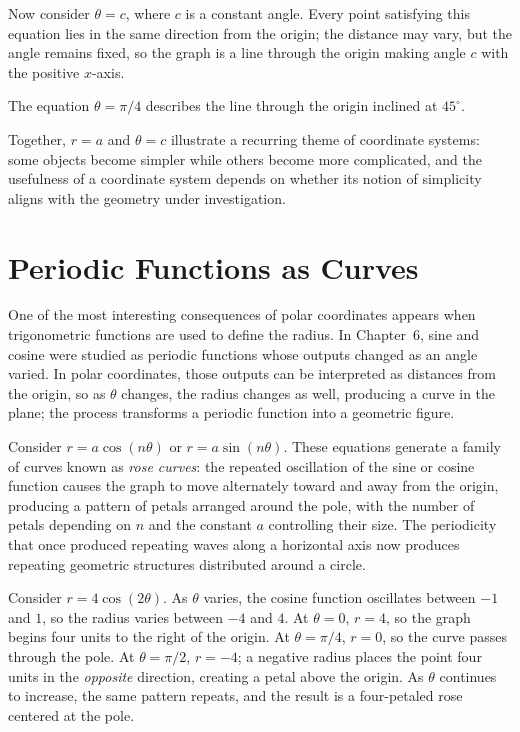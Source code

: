 Now consider $\theta = c$, where $c$ is a constant angle. Every point
satisfying this equation lies in the same direction from the origin; the
distance may vary, but the angle remains fixed, so the graph is a line
through the origin making angle $c$ with the positive $x$-axis.

\begin{example}
The equation $\theta = \pi/4$ describes the line through the origin
inclined at $45^\circ$.
\end{example}

Together, $r=a$ and $\theta=c$ illustrate a recurring theme of coordinate
systems: some objects become simpler while others become more
complicated, and the usefulness of a coordinate system depends on whether
its notion of simplicity aligns with the geometry under investigation.

\section{Periodic Functions as Curves}

One of the most interesting consequences of polar coordinates appears
when trigonometric functions are used to define the radius. In
Chapter~6, sine and cosine were studied as periodic functions whose
outputs changed as an angle varied. In polar coordinates, those outputs
can be interpreted as distances from the origin, so as $\theta$ changes,
the radius changes as well, producing a curve in the plane; the process
transforms a periodic function into a geometric figure.

Consider $r = a\cos(n\theta)$ or $r = a\sin(n\theta)$. These equations
generate a family of curves known as \emph{rose curves}: the repeated
oscillation of the sine or cosine function causes the graph to move
alternately toward and away from the origin, producing a pattern of
petals arranged around the pole, with the number of petals depending on
$n$ and the constant $a$ controlling their size. The periodicity that
once produced repeating waves along a horizontal axis now produces
repeating geometric structures distributed around a circle.

\begin{example}
Consider $r = 4\cos(2\theta)$. As $\theta$ varies, the cosine function
oscillates between $-1$ and $1$, so the radius varies between $-4$ and
$4$. At $\theta = 0$, $r = 4$, so the graph begins four units to the
right of the origin. At $\theta = \pi/4$, $r = 0$, so the curve passes
through the pole. At $\theta = \pi/2$, $r = -4$; a negative radius places
the point four units in the \emph{opposite} direction, creating a petal
above the origin. As $\theta$ continues to increase, the same pattern
repeats, and the result is a four-petaled rose centered at the pole.
\end{example}

